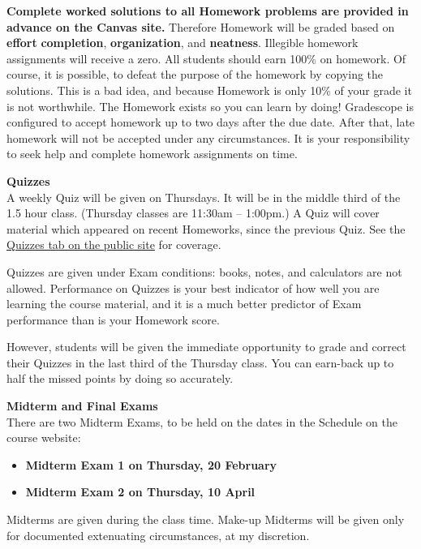 \documentclass[12pt]{article}
\renewcommand{\emph}[1]{\textsf{\textbf{#1}}}
\newcommand{\localhead}[1]{\par\smallskip\textbf{#1} \smallskip\nobreak\\}%
\def\heading#1{\localhead{\large\emph{#1}}}
\begin{document}
\newpage
 
\emph{Complete worked solutions to all Homework problems are provided
in advance on the Canvas site.}  Therefore Homework will be graded
based on \emph{effort} \emph{completion}, \emph{organization}, and
\emph{neatness}.  Illegible homework assignments will receive a
zero. All students should
earn 100\% on homework.  Of course, it is possible, to defeat the
purpose of the homework by copying the solutions.  This is a bad idea,
and because Homework is only 10\% of your grade it is not worthwhile.
The Homework exists so you can learn by doing! Gradescope is
configured to accept homework up to two days after the due date. After
that, late homework will not be accepted under any circumstances. It
is your responsibility to seek help and complete homework
assignments on time.



\heading{Quizzes}
A weekly Quiz will be given on Thursdays.  It will be in the middle
third of the 1.5 hour class.  (Thursday classes are 11:30am --
1:00pm.)  A Quiz will cover material which appeared on recent
Homeworks, since the previous Quiz.  See the
\href{https://uaf-math251.github.io/calc2/quizzes.html}{Quizzes tab on
the public site} for coverage.

Quizzes are given under Exam conditions: books, notes, and calculators
are not allowed.  Performance on Quizzes is your best indicator of how
well you are learning the course material, and it is a much better
predictor of Exam performance than is your Homework score.

However, students will be given the immediate opportunity to grade and
correct their Quizzes in the last third of the Thursday class.  You
can earn-back up to half the missed points by doing so accurately.


\heading{Midterm and Final Exams}
There are two Midterm Exams, to be held on the dates in the Schedule on the course website:
\begin{itemize}
\item \emph{Midterm Exam 1 on Thursday, 20 February}
\item \emph{Midterm Exam 2 on Thursday, 10 April}
\end{itemize}
Midterms are given during the class time.  Make-up Midterms will be given only for documented extenuating circumstances, at my discretion.
\end{document}
